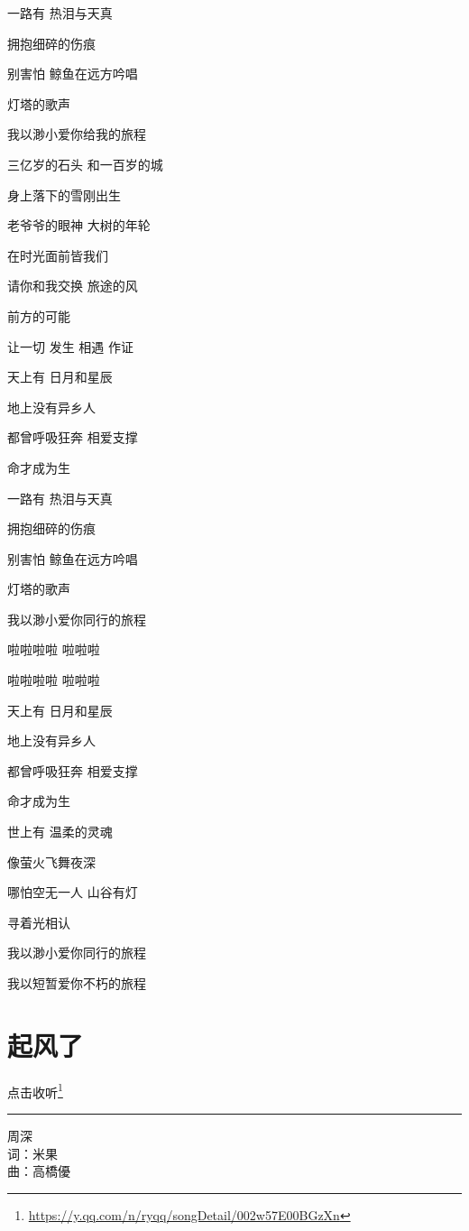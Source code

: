 \documentclass[]{ctexbook}
\renewcommand{\href}[2]{#2\footnote{\url{#1}}}
\begin{document}
一路有 热泪与天真

拥抱细碎的伤痕

别害怕 鲸鱼在远方吟唱

灯塔的歌声

我以渺小爱你给我的旅程

三亿岁的石头 和一百岁的城

身上落下的雪刚出生

老爷爷的眼神 大树的年轮

在时光面前皆我们

请你和我交换 旅途的风

前方的可能

让一切 发生 相遇 作证

天上有 日月和星辰

地上没有异乡人

都曾呼吸狂奔 相爱支撑

命才成为生

一路有 热泪与天真

拥抱细碎的伤痕

别害怕 鲸鱼在远方吟唱

灯塔的歌声

我以渺小爱你同行的旅程

啦啦啦啦 啦啦啦

啦啦啦啦 啦啦啦

天上有 日月和星辰

地上没有异乡人

都曾呼吸狂奔 相爱支撑

命才成为生

世上有 温柔的灵魂

像萤火飞舞夜深

哪怕空无一人 山谷有灯

寻着光相认

我以渺小爱你同行的旅程

我以短暂爱你不朽的旅程

\section*{起风了}\label{the-wind-rises}


\href{https://y.qq.com/n/ryqq/songDetail/002w57E00BGzXn}{点击收听}

\begin{center}\rule{0.5\linewidth}{0.5pt}\end{center}

周深\\
词：米果\\
曲：高橋優
\end{document}

